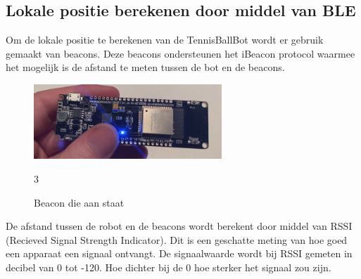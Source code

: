 \subsection{Lokale positie berekenen door middel van BLE}
Om de lokale positie te berekenen van de TennisBallBot wordt er gebruik gemaakt van beacons. Deze beacons ondersteunen het iBeacon protocol \cite{ibeacon} waarmee het mogelijk is de afstand te meten tussen de bot en de beacons. \\
\begin{figure}[H]
    \centering
    \includegraphics[width=200pt]{img/beacon.png}
    \caption{Beacon die aan staat}
    \label{fig:beacon}3
\end{figure}

De afstand tussen de robot en de beacons wordt berekent door middel van RSSI (Recieved Signal Strength Indicator). Dit is een geschatte meting van hoe goed een apparaat een signaal ontvangt. De signaalwaarde wordt bij RSSI gemeten in decibel van 0 tot -120. Hoe dichter bij de 0 hoe sterker het signaal zou zijn. \\

